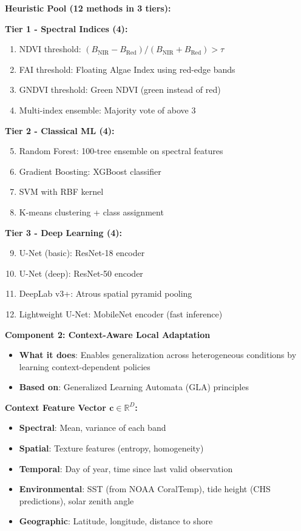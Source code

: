 \documentclass[11pt]{article}
\begin{document}
\textbf{Heuristic Pool (12 methods in 3 tiers):}

\textbf{Tier 1 - Spectral Indices (4):}
\begin{enumerate}
    \item NDVI threshold: $(B_{\text{NIR}} - B_{\text{Red}}) / (B_{\text{NIR}} + B_{\text{Red}}) > \tau$
    \item FAI threshold: Floating Algae Index using red-edge bands
    \item GNDVI threshold: Green NDVI (green instead of red)
    \item Multi-index ensemble: Majority vote of above 3
\end{enumerate}

\textbf{Tier 2 - Classical ML (4):}
\begin{enumerate}
    \setcounter{enumi}{4}
    \item Random Forest: 100-tree ensemble on spectral features
    \item Gradient Boosting: XGBoost classifier
    \item SVM with RBF kernel
    \item K-means clustering + class assignment
\end{enumerate}

\textbf{Tier 3 - Deep Learning (4):}
\begin{enumerate}
    \setcounter{enumi}{8}
    \item U-Net (basic): ResNet-18 encoder
    \item U-Net (deep): ResNet-50 encoder
    \item DeepLab v3+: Atrous spatial pyramid pooling
    \item Lightweight U-Net: MobileNet encoder (fast inference)
\end{enumerate}

\textbf{Component 2: Context-Aware Local Adaptation}

\begin{itemize}
    \item \textbf{What it does}: Enables generalization across heterogeneous conditions by learning context-dependent policies
    \item \textbf{Based on}: Generalized Learning Automata (GLA) principles
\end{itemize}

\textbf{Context Feature Vector $\mathbf{c} \in \mathbb{R}^D$:}
\begin{itemize}
    \item \textbf{Spectral}: Mean, variance of each band
    \item \textbf{Spatial}: Texture features (entropy, homogeneity)
    \item \textbf{Temporal}: Day of year, time since last valid observation
    \item \textbf{Environmental}: SST (from NOAA CoralTemp), tide height (CHS predictions), solar zenith angle
    \item \textbf{Geographic}: Latitude, longitude, distance to shore
\end{itemize}
\end{document}
